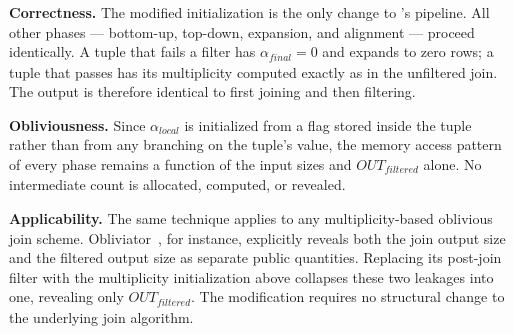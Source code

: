 \noindent\textbf{Correctness.} The modified initialization is the only
change to \wei's pipeline. All other phases --- bottom-up, top-down,
expansion, and alignment --- proceed identically. A tuple that fails a
filter has $\alpha_{\mathit{final}} = 0$ and expands to zero rows;
a tuple that passes has its multiplicity computed exactly as in the
unfiltered join. The output is therefore identical to first joining and
then filtering.

\noindent\textbf{Obliviousness.} Since $\alpha_{\mathit{local}}$ is
initialized from a flag stored inside the tuple rather than from any
branching on the tuple's value, the memory access pattern of every
phase remains a function of the input sizes and $\mathit{OUT}_{\mathit{filtered}}$
alone. No intermediate count
is allocated, computed, or revealed.

\noindent\textbf{Applicability.} The same technique applies to any
multiplicity-based oblivious join scheme. Obliviator~\cite{mavrogiannakis2025obliviator},
for instance, explicitly reveals both the join output size and the
filtered output size as separate public quantities. Replacing its
post-join filter with the multiplicity initialization above collapses
these two leakages into one, revealing only
$\mathit{OUT}_{\mathit{filtered}}$. The modification requires no
structural change to the underlying join algorithm.





